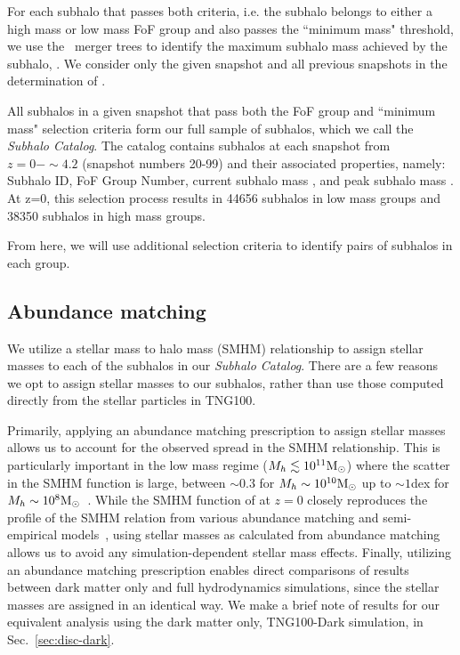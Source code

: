 \documentclass[twocolumn]{aastex631}
\newcommand{\subcat}{\textit{Subhalo Catalog}}
\begin{document}
    For each subhalo that passes both criteria, i.e. the subhalo belongs to either a high mass or low mass FoF group and also passes the ``minimum mass" threshold, we use the \sublink\ merger trees to identify the maximum subhalo mass achieved by the subhalo, \Mpeak. 
    We consider only the given snapshot and all previous snapshots in the determination of \Mpeak.

    All subhalos in a given snapshot that pass both the FoF group and ``minimum mass" selection criteria form our full sample of subhalos, which we call the \subcat. 
    The catalog contains subhalos at each snapshot from $z=0-\sim4.2$ (snapshot numbers 20-99) and their associated properties, namely: Subhalo ID, FoF Group Number, current subhalo mass \Mhalo, and peak subhalo mass \Mpeak. 
    At z=0, this selection process results in 44656 subhalos in low mass groups and 38350 subhalos in high mass groups.   
    
    From here, we will use additional selection criteria to identify pairs of subhalos in each group.

    \subsection{Abundance matching} \label{sec:methods-am}
    We utilize a stellar mass to halo mass (SMHM) relationship to assign stellar masses to each of the subhalos in our \subcat.  
    There are a few reasons we opt to assign stellar masses to our subhalos, rather than use those computed directly from the stellar particles in TNG100.

    Primarily, applying an abundance matching prescription to assign stellar masses allows us to account for the observed spread in the SMHM relationship. 
    This is particularly important in the low mass regime ($M_h \lesssim 10^{11}\mathrm{M}_\odot$) where the scatter in the SMHM function is large, between $\sim 0.3$ for $M_{h}\sim 10^{10}\mathrm{M}_\odot$ up to $\sim 1$dex for $M_{h}\sim10^{8}\mathrm{M}_\odot$~\citep{Munshi2021}. 
    While the SMHM function of \tng{} at $z=0$ closely reproduces the profile of the SMHM relation from various abundance matching and semi-empirical models~\citep{TNG5,Nelson2019}, using stellar masses as calculated from abundance matching allows us to avoid any simulation-dependent stellar mass effects. 
    Finally, utilizing an abundance matching prescription enables direct comparisons of results between dark matter only and full hydrodynamics simulations, since the stellar masses are assigned in an identical way. 
    We make a brief note of results for our equivalent analysis using the dark matter only, TNG100-Dark simulation, in Sec.~\ref{sec:disc-dark}.
    
\end{document}
